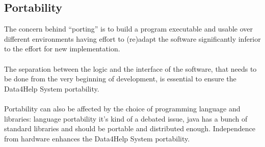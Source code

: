 \subsection{Portability}
The concern behind “porting” is to build a program executable and usable over different environments having effort to (re)adapt the software significantly inferior to the effort for new implementation. 
\\
\\
The separation between the logic and the interface of the software, that needs to be done from the very beginning of development, is essential to ensure the Data4Help System portability.  
\\
\\
Portability can also be affected by the choice of programming language and libraries: language portability it’s kind of a debated issue, java has a bunch of standard libraries and should be portable and distributed enough. Independence from hardware enhances the  Data4Help System portability. 

